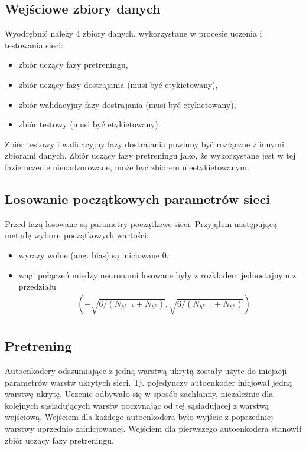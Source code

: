 \documentclass[fleqn]{scrartcl}
\begin{document}
\subsection{Wejściowe zbiory danych}
Wyodrębnić należy 4 zbiory danych, wykorzystane w procesie uczenia i testowania sieci:
\begin{itemize}
    \item zbiór uczący fazy pretreningu,
    \item zbiór uczący fazy dostrajania (musi być etykietowany),
    \item zbiór walidacyjny fazy dostrajania (musi być etykietowany),
    \item zbiór testowy (musi być etykietowany).
\end{itemize}

Zbiór testowy i walidacyjny fazy dostrajania powinny być rozłączne z innymi zbiorami danych. Zbiór uczący fazy pretreningu jako, że wykorzystane jest w tej fazie uczenie nienadzorowane, może być zbiorem nieetykietowanym.


\subsection{Losowanie początkowych parametrów sieci}
Przed fazą losowane są parametry początkowe sieci.
Przyjąłem następującą metodę wyboru początkowych wartości:
\begin{itemize}
    \item wyrazy wolne (ang. bias) są inicjowane 0,
    \item wagi połączeń między neuronami losowane były z rozkładem jednostajnym z przedziału 
    \begin{align*}
        &(-\sqrt{6 / (N_{h^{k-1}} + N_{h^{k}})}, \sqrt{6 / (N_{h^{k-1}} + N_{h^{k}})}) \\
    \end{align*}
\end{itemize} 


\subsection{Pretrening}
Autoenkodery odszumiające z jedną warstwą ukrytą zostały użyte do inicjacji parametrów warstw ukrytych sieci. Tj. pojedynczy autoenkoder inicjował jedną warstwę ukrytę.
Uczenie odbywało się w sposób zachłanny, niezależnie dla kolejnych sąsiadujących warstw poczynając od tej sąsiadującej z warstwą wejściową. Wejściem dla każdego autoenkodera było wyjście z poprzedniej warstwy uprzednio zainicjowanej. Wejściem dla pierwszego autoenkodera stanowił zbiór uczący fazy pretreningu.
\end{document}
